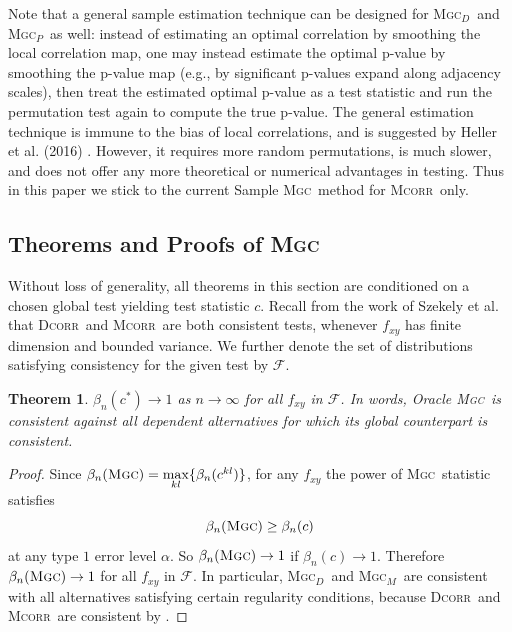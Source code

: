 \documentclass[11pt]{article}
\providecommand{\sct}[1]{{\normalfont\textsc{#1}}}
\providecommand{\mc}[1]{\mathcal{#1}}
\newcommand{\GG}{c}
\newcommand{\Mgc}{\sct{Mgc}}
\newcommand{\Mgcp}{\sct{Mgc$_P$}}
\newcommand{\Mgcd}{\sct{Mgc$_D$}}
\newcommand{\Mgcm}{\sct{Mgc$_M$}}
\newcommand{\Dcorr}{\sct{Dcorr}}
\newcommand{\Mcorr}{\sct{Mcorr}}
\newcommand{\Mantel}{\sct{Mantel}}
\newtheorem{thm}{Theorem}
\begin{document}
Note that a general sample estimation technique can be designed for \Mgcd~and \Mgcp~as well: instead of estimating an optimal correlation by smoothing the local correlation map, one may instead estimate the optimal p-value by smoothing the p-value map (e.g., by significant p-values expand along adjacency scales), then treat the estimated optimal p-value as a test statistic and run the permutation test again to compute the true p-value. The general estimation technique is immune to the bias of local correlations, and is suggested by Heller et al. (2016) \cite{heller2016consistent}. However, it requires more random permutations, is much slower, and does not offer any more theoretical or numerical advantages in testing. Thus in this paper we stick to the current Sample \Mgc~method for \Mcorr~only.


\subsection{Theorems and Proofs of \Mgc}
\label{appen:theory}

Without loss of generality, all theorems in this section are conditioned on a chosen global test yielding test statistic $\GG$.
Recall from the work of Szekely et al. that \Dcorr~and \Mcorr~are both consistent tests, whenever $f_{xy}$ has finite dimension and bounded variance. We further denote the set of distributions satisfying consistency for the given test by $\mc{F}$.
\begin{thm}
\label{t:thm1}
$\beta_n(\GG^*) \rightarrow 1$ as $n \to \infty$ for all $f_{xy}$ in $\mc{F}$.
In words, Oracle \Mgc~is consistent against all dependent alternatives for which its global counterpart is consistent. 
\end{thm}
\begin{proof}
Since $\beta_n(\Mgc)=\underset{kl}{\max}\{\beta_n(\GG^{kl})\}$, for any $f_{xy}$ the power of \Mgc~statistic satisfies
\begin{equation*}
\beta_n(\Mgc) \geq \beta_n(\GG)
\end{equation*}
at any type $1$ error level $\alpha$. So $\beta_n(\Mgc) \rightarrow 1$ if $\beta_n(\GG) \rightarrow 1$.
% 
Therefore $\beta_n(\Mgc) \rightarrow 1$ for all $f_{xy}$ in $\mc{F}$. In particular, \Mgcd~and \Mgcm~are consistent with all alternatives satisfying certain regularity conditions, because \Dcorr~and \Mcorr~are consistent by \cite{SzekelyRizzoBakirov2007, SzekelyRizzo2013a}. 
\end{proof}
\end{document}
